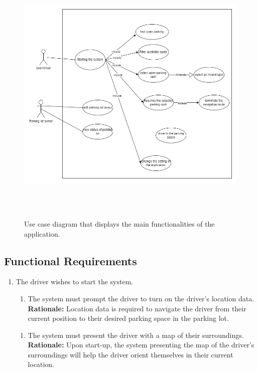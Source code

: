 \documentclass[12pt,letterpaper]{article}
\newcounter{businesseventnum}
\newcounter{funcreqnum}
\begin{document}
\begin{figure}[H]
    \centering
    \includegraphics[width=12cm, height=13cm]{use_case.jpg}
    \caption{Use case diagram that displays the main functionalities of the application.}
\end{figure}

\subsection{Functional Requirements}
\begin{enumerate}[{BE}\thebusinesseventnum.] 
\item The driver wishes to start the system.
\begin{enumerate}[{FR}\thefuncreqnum.] 
    \item The system must prompt the driver to turn on the driver's location
    data.\\
    \textbf{Rationale:} Location data is required to navigate the driver from
    their current position to their desired parking space in the parking lot.
\end{enumerate}
\begin{enumerate}[{FR}\thefuncreqnum.] 
    \item The system must present the driver with a map of their surroundings.\\
    \textbf{Rationale:} Upon start-up, the system presenting the map of the
    driver's surroundings will help the driver orient themselves in their
    current location.
\end{enumerate}
\end{enumerate}
\end{document}
